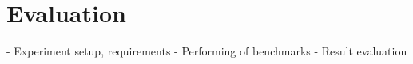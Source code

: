\chapter{Evaluation}
\label{ch:evaluation}




- Experiment setup, requirements
- Performing of benchmarks
- Result evaluation